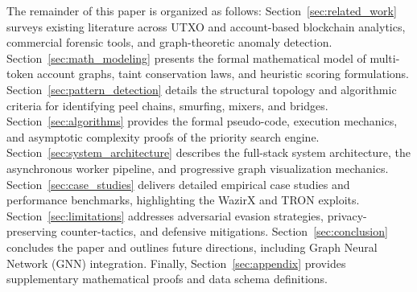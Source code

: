 The remainder of this paper is organized as follows:
Section~\ref{sec:related_work} surveys existing literature across UTXO and account-based blockchain analytics, commercial forensic tools, and graph-theoretic anomaly detection.
Section~\ref{sec:math_modeling} presents the formal mathematical model of multi-token account graphs, taint conservation laws, and heuristic scoring formulations.
Section~\ref{sec:pattern_detection} details the structural topology and algorithmic criteria for identifying peel chains, smurfing, mixers, and bridges.
Section~\ref{sec:algorithms} provides the formal pseudo-code, execution mechanics, and asymptotic complexity proofs of the priority search engine.
Section~\ref{sec:system_architecture} describes the full-stack system architecture, the asynchronous worker pipeline, and progressive graph visualization mechanics.
Section~\ref{sec:case_studies} delivers detailed empirical case studies and performance benchmarks, highlighting the WazirX and TRON exploits.
Section~\ref{sec:limitations} addresses adversarial evasion strategies, privacy-preserving counter-tactics, and defensive mitigations.
Section~\ref{sec:conclusion} concludes the paper and outlines future directions, including Graph Neural Network (GNN) integration.
Finally, Section~\ref{sec:appendix} provides supplementary mathematical proofs and data schema definitions.

